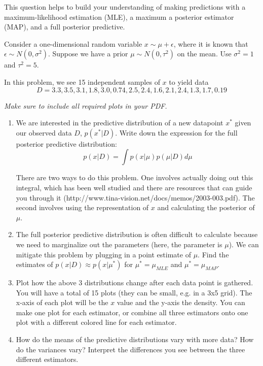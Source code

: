 \documentclass[submit]{harvardml}
\begin{document}
\begin{problem}

  This question helps to build your understanding of making
  predictions with a maximum-likelihood estimation (MLE), a maximum a
  posterior estimator (MAP), and a full posterior predictive.

  Consider a one-dimensional random variable $x \sim \mu + \epsilon$,
  where it is known that $\epsilon \sim N(0,\sigma^2)$.  Suppose we
  have a prior $\mu \sim N(0,\tau^2)$ on the mean.  Use $\sigma^2 = 1$
  and $\tau^2 = 5$.  

  In this problem, we see 15 independent samples of $x$ to yield data
  $$D = 3.3, 3.5, 3.1, 1.8, 3.0, 0.74, 2.5, 2.4, 1.6, 2.1, 2.4, 1.3, 1.7, 0.19$$
    
  \textit{Make sure to include all required plots in your PDF.}

\begin{enumerate}

\item We are interested in the predictive distribution of a new datapoint $x^*$ given our observed data $D$, $p(x^*|D)$.
  Write down the expression for the full posterior predictive distribution: $$p(x|D) = \int p(x|\mu)p(\mu|D) d\mu$$
  
  There are two ways to do this problem. One involves actually doing out this integral, which has been well studied and there are resources that can guide you through it (http://www.tina-vision.net/docs/memos/2003-003.pdf). The second involves using the representation of $x$ and calculating the posterior of $\mu$.
  
 \item The full posterior predictive distribution is often difficult to calculate because we need to marginalize out the parameters (here, the parameter is $\mu$). We can mitigate this problem by plugging in a point estimate of $\mu$. Find the estimates of $p(x|D) \approx p(x|\mu^*)$ for $\mu^* = \mu_{MLE}$ and $\mu^* = \mu_{MAP}$.
   
\item Plot how the above 3 distributions change after each data point is
  gathered.  You will have a total of 15 plots (they can be small,
  e.g. in a 3x5 grid).  The x-axis of each plot will be the $x$ value
  and the y-axis the density.  You can make one plot for each
  estimator, or combine all three estimators onto one plot with a
  different colored line for each estimator.
  
    
\item How do the means of the predictive distributions vary with more
  data?  How do the variances vary?  Interpret the differences you see
  between the three different estimators.
  

\end{enumerate}
\end{problem}
\end{document}
